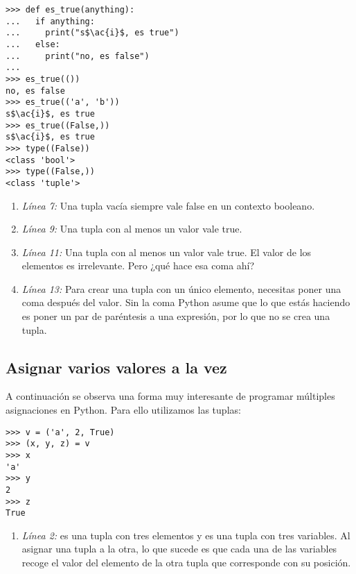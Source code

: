 \noindent\begin{minipage}{\textwidth}
\begin{lstlisting}[mathescape=True]
>>> def es_true(anything):
...   if anything:
...     print("s$\ac{i}$, es true")
...   else:
...     print("no, es false")
...
>>> es_true(())
no, es false
>>> es_true(('a', 'b'))
s$\ac{i}$, es true
>>> es_true((False,))
s$\ac{i}$, es true
>>> type((False))
<class 'bool'>
>>> type((False,))
<class 'tuple'>
\end{lstlisting}
\end{minipage}

\begin{enumerate}

\item \emph{Línea 7:} Una tupla vacía siempre vale false en un contexto booleano.

\item \emph{Línea 9:} Una tupla con al menos un valor vale true.

\item \emph{Línea 11:} Una tupla con al menos un valor vale true. El valor de los elementos es irrelevante. Pero ¿qué hace esa coma ahí?

\item \emph{Línea 13:} Para crear una tupla con un único elemento, necesitas poner una coma después del valor. Sin la coma Python asume que lo que estás haciendo es poner un par de paréntesis a una expresión, por lo que no se crea una tupla.

\end{enumerate}

\subsection{Asignar varios valores a la vez}

A continuación se observa una forma muy interesante de programar múltiples asignaciones en Python. Para ello utilizamos las tuplas:

\noindent\begin{minipage}{\textwidth}
\begin{lstlisting}[mathescape=True]
>>> v = ('a', 2, True)
>>> (x, y, z) = v
>>> x
'a'
>>> y
2
>>> z
True
\end{lstlisting}
\end{minipage}

\begin{enumerate}

\item \emph{Línea 2:}  es una tupla con tres elementos y  es una tupla con tres variables. Al asignar una tupla a la otra, lo que sucede es que cada una de las variables recoge el valor del elemento de la otra tupla que corresponde con su posición.

\end{enumerate}

